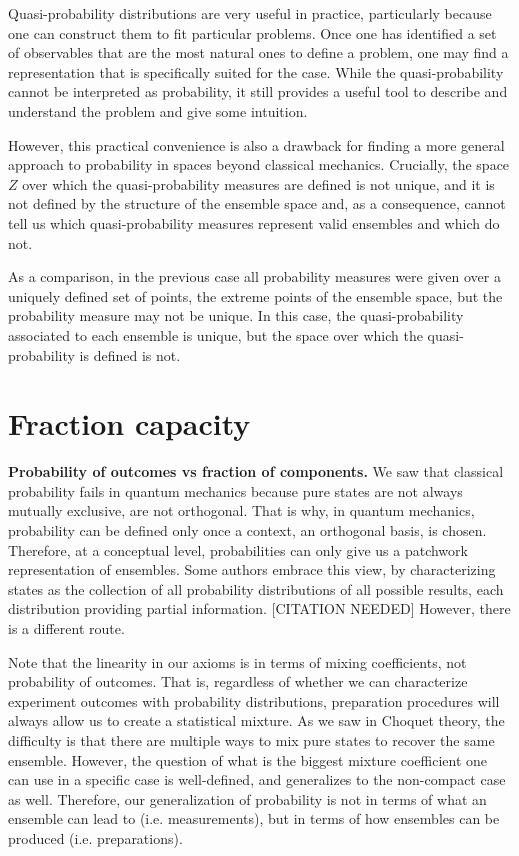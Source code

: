 \documentclass[10pt,twocolumn, nofootinbib]{revtex4-2}
\begin{document}
Quasi-probability distributions are very useful in practice, particularly because one can construct them to fit particular problems. Once one has identified a set of observables that are the most natural ones to define a problem, one may find a representation that is specifically suited for the case. While the quasi-probability cannot be interpreted as probability, it still provides a useful tool to describe and understand the problem and give some intuition.

However, this practical convenience is also a drawback for finding a more general approach to probability in spaces beyond classical mechanics. Crucially, the space $Z$ over which the quasi-probability measures are defined is not unique, and it is not defined by the structure of the ensemble space and, as a consequence, cannot tell us which quasi-probability measures represent valid ensembles and which do not.

As a comparison, in the previous case all probability measures were given over a uniquely defined set of points, the extreme points of the ensemble space, but the probability measure may not be unique. In this case, the quasi-probability associated to each ensemble is unique, but the space over which the quasi-probability is defined is not.

\section{Fraction capacity}

\textbf{Probability of outcomes vs fraction of components.} We saw that classical probability fails in quantum mechanics because pure states are not always mutually exclusive, are not orthogonal. That is why, in quantum mechanics, probability can be defined only once a context, an orthogonal basis, is chosen. Therefore, at a conceptual level, probabilities can only give us a patchwork representation of ensembles. Some authors embrace this view, by characterizing states as the collection of all probability distributions of all possible results, each distribution providing partial information. [CITATION NEEDED] However, there is a different route.

Note that the linearity in our axioms is in terms of mixing coefficients, not probability of outcomes. That is, regardless of whether we can characterize experiment outcomes with probability distributions, preparation procedures will always allow us to create a statistical mixture. As we saw in Choquet theory, the difficulty is that there are multiple ways to mix pure states to recover the same ensemble. However, the question of what is the biggest mixture coefficient one can use in a specific case is well-defined, and generalizes to the non-compact case as well. Therefore, our generalization of probability is not in terms of what an ensemble can lead to (i.e. measurements), but in terms of how ensembles can be produced (i.e. preparations).
\end{document}
